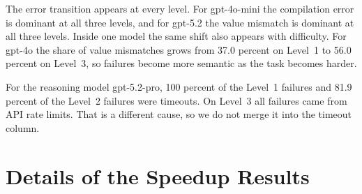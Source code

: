 \begin{table}[h]
\centering
\small
\setlength{\tabcolsep}{4pt}
\caption{Share of each error type among failed tasks, by model and by level.}
\label{tab:error_detail}
\end{table}

The error transition appears at every level. For gpt-4o-mini the compilation error is dominant at
all three levels, and for gpt-5.2 the value mismatch is dominant at all three levels. Inside one
model the same shift also appears with difficulty. For gpt-4o the share of value mismatches grows
from 37.0 percent on Level~1 to 56.0 percent on Level~3, so failures become more semantic as the
task becomes harder.

For the reasoning model gpt-5.2-pro, 100 percent of the Level~1 failures and 81.9 percent of the
Level~2 failures were timeouts. On Level~3 all failures came from API rate limits. That is a
different cause, so we do not merge it into the timeout column.

\section{Details of the Speedup Results}

